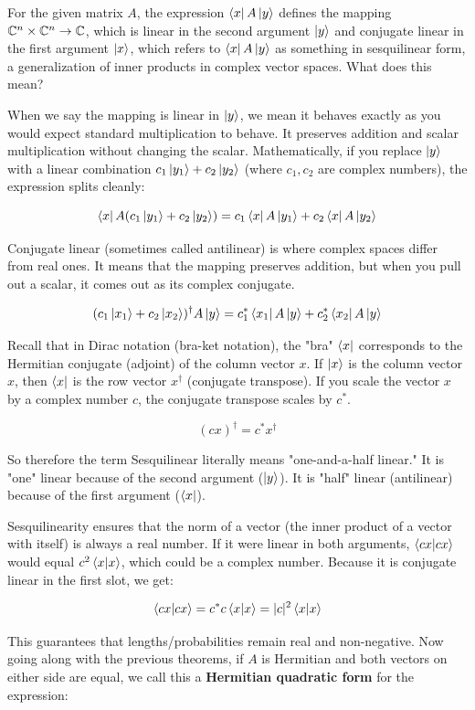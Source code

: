 \documentclass[12pt]{article}
\begin{document}
For the given matrix $A$, the expression $\bra{x} A \ket{y}$ defines the mapping $\mathbb{C}^n \times \mathbb{C}^n \rightarrow \mathbb{C}$, which is linear in the second argument $\ket{y}$ and conjugate linear in the first argument $\ket{x}$, which refers to $\bra{x} A \ket{y}$ as something in sesquilinear form, a generalization of inner products in complex vector spaces. What does this mean? 

When we say the mapping is linear in $\ket{y}$, we mean it behaves exactly as you would expect standard multiplication to behave. It preserves addition and scalar multiplication without changing the scalar. Mathematically, if you replace $\ket{y}$ with a linear combination $c_1\ket{y_1} + c_2\ket{y_2}$ (where $c_1, c_2$ are complex numbers), the expression splits cleanly:

$$
\bra{x} A (c_1\ket{y_1} + c_2\ket{y_2}) = c_1 \bra{x} A \ket{y_1} + c_2 \bra{x} A \ket{y_2}
$$

Conjugate linear (sometimes called antilinear) is where complex spaces differ from real ones. It means that the mapping preserves addition, but when you pull out a scalar, it comes out as its complex conjugate.

$$
(c_1\ket{x_1} + c_2\ket{x_2})^\dagger A \ket{y} = c_1^* \bra{x_1} A \ket{y} + c_2^* \bra{x_2} A \ket{y}
$$

Recall that in Dirac notation (bra-ket notation), the "bra" $\bra{x}$ corresponds to the Hermitian conjugate (adjoint) of the column vector $x$. If $\ket{x}$ is the column vector $x$, then $\bra{x}$ is the row vector $x^\dagger$ (conjugate transpose). If you scale the vector $x$ by a complex number $c$, the conjugate transpose scales by $c^*$.

$$
(c x)^\dagger = c^* x^\dagger
$$


So therefore the term Sesquilinear literally means "one-and-a-half linear." It is "one" linear because of the second argument ($\ket{y}$). It is "half" linear (antilinear) because of the first argument ($\bra{x}$). 

Sesquilinearity ensures that the norm of a vector (the inner product of a vector with itself) is always a real number. If it were linear in both arguments, $\braket{cx}{cx}$ would equal $c^2 \braket{x}{x}$, which could be a complex number. Because it is conjugate linear in the first slot, we get:

$$
\braket{cx}{cx} = c^* c \braket{x}{x} = |c|^2 \braket{x}{x}
$$

This guarantees that lengths/probabilities remain real and non-negative. Now going along with the previous theorems, if $A$ is Hermitian and both vectors on either side are equal, we call this a \textbf{Hermitian quadratic form} for the expression:
\end{document}

